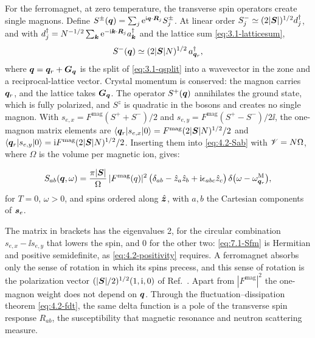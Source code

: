 For the ferromagnet, at zero temperature, the transverse spin operators create single magnons. Define $S^\pm(\bm{q}) = \sum_j\mathrm{e}^{\mathrm{i}\bm{q}\cdot\bm{R}_j}S^\pm_j$. At linear order $S^-_j \simeq (2|\bm{S}|)^{1/2}d^\dagger_j$, and with $d^\dagger_j = N^{-1/2}\sum_{\bm{k}}\mathrm{e}^{-\mathrm{i}\bm{k}\cdot\bm{R}_j}a^\dagger_{\bm{k}}$ and the lattice sum \cref{eq:3.1-latticesum},
\begin{equation*}
  S^-(\bm{q}) \simeq (2|\bm{S}|N)^{1/2}\,a^\dagger_{\bm{q}_r} ,
\end{equation*}
where $\bm{q} = \bm{q}_r + \bm{G}_{\bm{q}}$ is the split of \cref{eq:3.1-qsplit} into a wavevector in the zone and a reciprocal-lattice vector. Crystal momentum is conserved: the magnon carries $\bm{q}_r$, and the lattice takes $\bm{G}_{\bm{q}}$. The operator $S^+(\bm{q})$ annihilates the ground state, which is fully polarized, and $S^z$ is quadratic in the bosons and creates no single magnon. With $s_{e,x} = F^{\mathrm{mag}}(S^+ + S^-)/2$ and $s_{e,y} = F^{\mathrm{mag}}(S^+ - S^-)/2\ii$, the one-magnon matrix elements are $\langle\bm{q}_r|s_{e,x}|0\rangle = F^{\mathrm{mag}}(2|\bm{S}|N)^{1/2}/2$ and $\langle\bm{q}_r|s_{e,y}|0\rangle = \mathrm{i} F^{\mathrm{mag}}(2|\bm{S}|N)^{1/2}/2$. Inserting them into \cref{eq:4.2-Sab} with $\mathscr{V} = N\Omega$, where $\Omega$ is the volume per magnetic ion, gives:
\begin{keyresult}
\begin{equation}
  S_{ab}(\bm{q},\omega) = \frac{\pi|\bm{S}|}{\Omega}\,|F^{\mathrm{mag}}(q)|^2\,\bigl(\delta_{ab} - \hat z_a\hat z_b + \mathrm{i}\epsilon_{abc}\hat z_c\bigr)\,\delta\bigl(\omega - \omega^{\mathrm{M}}_{\bm{q}_r}\bigr) ,
  \label{eq:7.1-Sfm}
\end{equation}
for $T = 0$, $\omega > 0$, and spins ordered along $\hat{\bm{z}}$, with $a, b$ the Cartesian components of $\bm{s}_e$.
\end{keyresult}
The matrix in brackets has the eigenvalues 2, for the circular combination $s_{e,x} - \ii s_{e,y}$ that lowers the spin, and 0 for the other two: \cref{eq:7.1-Sfm} is Hermitian and positive semidefinite, as \cref{eq:4.2-positivity} requires. A ferromagnet absorbs only the sense of rotation in which its spins precess, and this sense of rotation is the polarization vector $(|\bm{S}|/2)^{1/2}(1, \mathrm{i}, 0)$ of Ref.~\cite[Eq.~(6)]{trickle2020detecting}. Apart from $|F^{\mathrm{mag}}|^2$ the one-magnon weight does not depend on $\bm{q}$. Through the fluctuation--dissipation theorem \cref{eq:4.2-fdt}, the same delta function is a pole of the transverse spin response $R_{ab}$, the susceptibility that magnetic resonance and neutron scattering measure.

